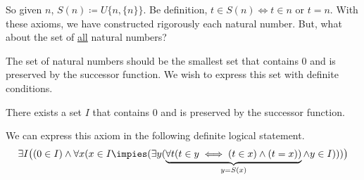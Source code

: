 \documentclass[11pt]{article}
\begin{document}
\begin{titlepage}
So given $n$, $S(n) \coloneqq U\{n,\{n\}\}$. Be definition, $t \in S(n) \iff t
\in n$ or $t = n$. With these axioms, we have constructed rigorously each
natural number. But, what about the set of \underline{all} natural numbers? 

The set of natural numbers should be the smallest set that contains 0 and is
preserved by the successor function. We wish to express this set with definite
conditions.

\begin{prop}
	There exists a set $I$ that contains 0 and is preserved by the successor
	function.
\end{prop}
We can express this axiom in the following definite logical statement.
\begin{equation*}
	\exists I \big((0 \in I) \wedge \forall x (x \in I \impies (\exists y
	(\underbrace{\forall t (t \in y \iff (t \in x) \wedge (t = x))}_{y = S(x)}
	\wedge y \in I))) \big)
\end{equation*}


\end{titlepage}
\end{document}
